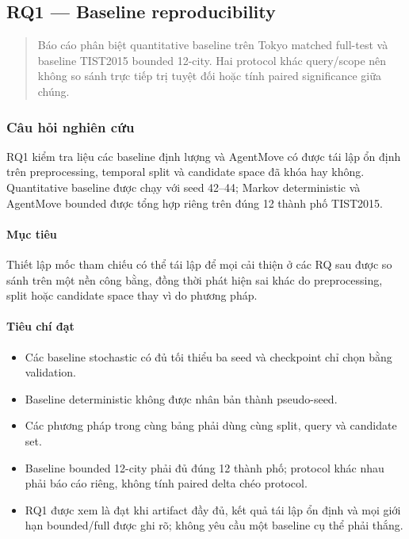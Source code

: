 
\subsection{RQ1 --- Baseline reproducibility}

\begin{quote}\small Báo cáo phân biệt quantitative baseline trên Tokyo matched full-test và baseline TIST2015 bounded 12-city. Hai protocol khác query/scope nên không so sánh trực tiếp trị tuyệt đối hoặc tính paired significance giữa chúng.\end{quote}
\subsubsection*{Câu hỏi nghiên cứu}

RQ1 kiểm tra liệu các baseline định lượng và AgentMove có được tái lập ổn định trên preprocessing, temporal split và candidate space đã khóa hay không. Quantitative baseline được chạy với seed 42--44; Markov deterministic và AgentMove bounded được tổng hợp riêng trên đúng 12 thành phố TIST2015.

\paragraph{Mục tiêu}

Thiết lập mốc tham chiếu có thể tái lập để mọi cải thiện ở các RQ sau được so sánh trên một nền công bằng, đồng thời phát hiện sai khác do preprocessing, split hoặc candidate space thay vì do phương pháp.

\paragraph{Tiêu chí đạt}

\begin{itemize}
\item Các baseline stochastic có đủ tối thiểu ba seed và checkpoint chỉ chọn bằng validation.
\item Baseline deterministic không được nhân bản thành pseudo-seed.
\item Các phương pháp trong cùng bảng phải dùng cùng split, query và candidate set.
\item Baseline bounded 12-city phải đủ đúng 12 thành phố; protocol khác nhau phải
báo cáo riêng, không tính paired delta chéo protocol.

\item RQ1 được xem là đạt khi artifact đầy đủ, kết quả tái lập ổn định và mọi giới
hạn bounded/full được ghi rõ; không yêu cầu một baseline cụ thể phải thắng.

\end{itemize}

